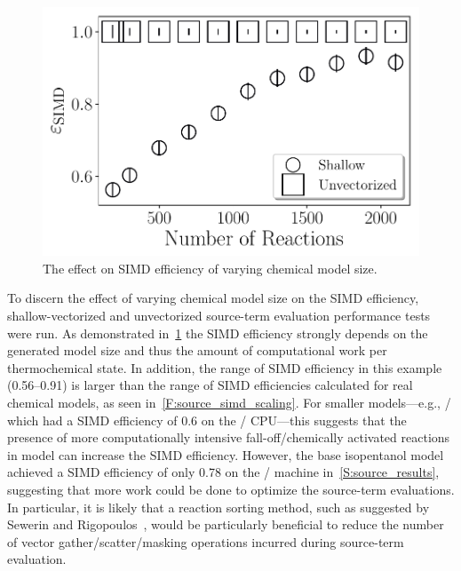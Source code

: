 \documentclass[12pt,number,sort&compress,preprint]{elsarticle}
\begin{document}
\begin{figure}[htbp]
\centering
\includegraphics[width=0.5\linewidth]{simd_efficiency_scaling}
\caption{The effect on SIMD efficiency of varying chemical model size.}
\label{F:simd_vs_rxns}
\end{figure}

To discern the effect of varying chemical model size on the SIMD efficiency, shallow-vectorized and unvectorized source-term evaluation performance tests were run.
As demonstrated in~\cref{F:simd_vs_rxns} the SIMD efficiency strongly depends on the generated model size and thus the amount of computational work per thermochemical state.
In addition, the range of SIMD efficiency in this example (\numrange{0.56}{0.91}) is larger than the range of SIMD efficiencies calculated for real chemical models, as seen in~\cref{F:source_simd_scaling}.
For smaller models---e.g., \slash{} which had a SIMD efficiency of \num{0.6} on the \avx/ CPU---this suggests that the presence of more computationally intensive fall-off\slash chemically activated reactions in model can increase the SIMD efficiency.
However, the base isopentanol model achieved a SIMD efficiency of only \num{0.78} on the \avx/ machine in~\cref{S:source_results}, suggesting that more work could be done to optimize the source-term evaluations.
In particular, it is likely that a reaction sorting method, such as suggested by Sewerin and Rigopoulos~\cite{Sewerin20151375}, would be particularly beneficial to reduce the number of vector gather\slash scatter\slash masking operations incurred during source-term evaluation.

\pagebreak

\end{document}
